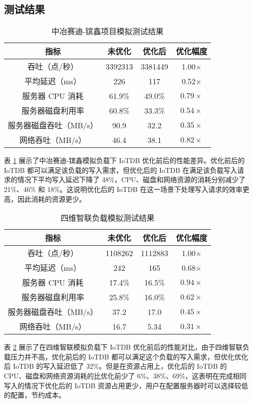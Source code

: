 \subsection{测试结果}

\begin{table}
  \centering
  \caption{中冶赛迪-镔鑫项目模拟测试结果}
  \begin{tabular}{cccc}
    \toprule 
    指标 &  未优化  & 优化后 & 优化幅度 \\
    \midrule
    吞吐（点/秒） & 3392313 & 3381449 & 1.00$\times$\\
    平均延迟（ms） & 226 & 	117 & 0.52$\times$\\
    服务器 CPU 消耗 & 61.9\% & 	49.0\% & $0.79\times$\\
    服务器磁盘利用率 & 60.8\% & 	33.3\% & $0.54\times$\\
    服务器磁盘吞吐（MB/s） & 90.9 & 32.2 & $0.35\times$ \\
    网络吞吐（MB/s） & 46.4 & 38.1 & $0.82\times$\\
    \bottomrule
  \end{tabular}
  \label{tabular:zysd-test-result}
\end{table}
表 \ref{tabular:zysd-test-result} 展示了中冶赛迪-镔鑫模拟负载下 IoTDB 优化前后的性能差异。优化前后的 IoTDB 都可以满足该负载的写入需求，但优化后的 IoTDB 在满足该负载写入请求的情况下平均写入延迟下降了 48\%，CPU、磁盘和网络资源的消耗分别减少了 21\%、46\% 和 18\%。这说明优化后的 IoTDB 在这一场景下处理写入请求的效率更高，因此消耗的资源更少。


\begin{table}
  \centering
  \caption{四维智联负载模拟测试结果}
  \begin{tabular}{cccc}
    \toprule 
    指标 &  未优化  & 优化后 & 优化幅度 \\
    \midrule
    吞吐（点/秒） & 1108262 & 	1112883 & 1.00$\times$\\
    平均延迟（ms） & 242 & 	165 & 0.68$\times$\\
    服务器 CPU 消耗 & 17.4\% & 	16.5\% & $0.94\times$\\
    服务器磁盘利用率 & 25.8\% & 	16.0\% & $0.62\times$\\
    服务器磁盘吞吐（MB/s） & 37.2 & 17.0 & $0.45\times$ \\
    网络吞吐（MB/s） & 16.7 & 5.34 & $0.31\times$\\
    \bottomrule
  \end{tabular}
  \label{tabular:swzl-test-result}
\end{table}
表 \ref{tabular:swzl-test-result} 展示了在四维智联模拟负载下 IoTDB 优化前后的性能对比，由于四维智联负载压力并不高，优化前后的 IoTDB 都可以满足这个负载的写入需求，但优化优化后 IoTDB 的写入延迟低了 32\%。但是在资源占用上，优化后的 IoTDB 的 CPU、磁盘和网络资源消耗的比优化前少了 6\%、38\%、69\%，这表明在完成相同写入的情况下优化后的 IoTDB 资源占用更少，用户在配置服务器时可以选择较低的配置，节约成本。

